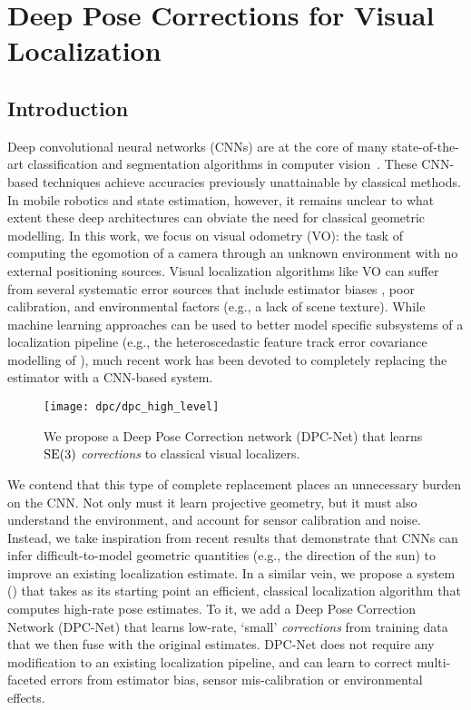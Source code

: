 \chapter{Deep Pose Corrections for Visual Localization}
\section{Introduction}
Deep convolutional neural networks (CNNs) are at the core of many state-of-the-art classification and segmentation algorithms in computer vision~\cite{LeCun2015-fw}. 
These CNN-based techniques achieve accuracies previously
unattainable by classical methods. In mobile robotics and state estimation, however, it remains unclear to what extent these deep architectures can obviate the need for classical geometric modelling. 
In this work, we focus on visual odometry (VO): the task of computing the egomotion of a camera through an unknown environment with no external positioning sources. Visual localization algorithms like VO can suffer from several systematic error sources
that include estimator biases \cite{Peretroukhin2014-db}, poor calibration, and environmental factors (e.g., a lack of scene texture). While machine learning approaches can be used to better model specific subsystems of a localization pipeline (e.g., the heteroscedastic feature track error covariance modelling of \cite{Peretroukhin2016-om, Peretroukhin2015-em}), much recent work \cite{Costante2016-hb, Clark2017-zg, Kendall2017-ix, Melekhov2017-dl, Oliveira2017-lt} has been devoted to completely replacing the estimator with a CNN-based system.

\begin{figure}
	\centering
	\texttt{[image: dpc/dpc\_high\_level]}
	\caption{We propose a Deep Pose Correction network (DPC-Net) that learns $\mathrm{SE}(3)$ \textit{corrections} to classical visual localizers.}
	\label{fig:system_overview}
	\vspace{-1.5em}
\end{figure}

We contend that this type of complete replacement places an unnecessary burden on the CNN. Not only must it learn projective geometry, but it must also understand the environment, and account for sensor calibration and noise.  Instead, we take inspiration from recent results \cite{Peretroukhin2017-eb} that demonstrate that CNNs can infer difficult-to-model geometric quantities (e.g., the direction of the sun) to improve an existing localization estimate.  
In a similar vein, we propose a system () that takes as its starting point an efficient, classical localization algorithm that computes high-rate pose estimates. To it, we add a Deep Pose Correction Network (DPC-Net) that learns low-rate, `small' \textit{corrections} from training data that we then fuse with the original estimates. DPC-Net does not require any modification to an existing localization pipeline, and can learn to correct multi-faceted errors from estimator bias, sensor mis-calibration or environmental effects.  

